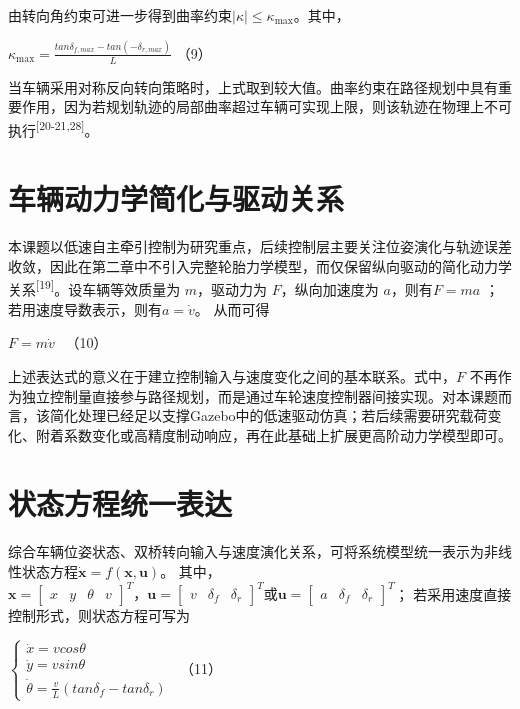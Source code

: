 由转向角约束可进一步得到曲率约束\(\mid \kappa \mid \leq \kappa_{\max}\)。其中，

\(\kappa_{\max} = \frac{tan\delta_{f,max} - tan( - \delta_{r,max})}{L}\)
（9）

当车辆采用对称反向转向策略时，上式取到较大值。曲率约束在路径规划中具有重要作用，因为若规划轨迹的局部曲率超过车辆可实现上限，则该轨迹在物理上不可执行\textsuperscript{[20-21,28]}。

\section{车辆动力学简化与驱动关系}

本课题以低速自主牵引控制为研究重点，后续控制层主要关注位姿演化与轨迹误差收敛，因此在第二章中不引入完整轮胎力学模型，而仅保留纵向驱动的简化动力学关系\textsuperscript{[19]}。设车辆等效质量为
\(m\)，驱动力为 \(F\)，纵向加速度为 \(a\)，则有\(F = ma\)
；若用速度导数表示，则有\(a = \dot{v}\)。\(
\) 从而可得

\(F = m\dot{v}\ \ \) （10）

上述表达式的意义在于建立控制输入与速度变化之间的基本联系。式中，\(F\)
不再作为独立控制量直接参与路径规划，而是通过车轮速度控制器间接实现。对本课题而言，该简化处理已经足以支撑Gazebo中的低速驱动仿真；若后续需要研究载荷变化、附着系数变化或高精度制动响应，再在此基础上扩展更高阶动力学模型即可。

\section{状态方程统一表达}

综合车辆位姿状态、双桥转向输入与速度演化关系，可将系统模型统一表示为非线性状态方程\(\dot{\mathbf{x}} = f(\mathbf{x},\mathbf{u})\)。\(
\) 其中，\(\mathbf{x} = \begin{bmatrix}
x & y & \theta & v
\end{bmatrix}^{T}，\mathbf{u} = \begin{bmatrix}
v & \delta_{f} & \delta_{r}
\end{bmatrix}^{T}\text{或}\mathbf{u} = \begin{bmatrix}
a & \delta_{f} & \delta_{r}
\end{bmatrix}^{T}\)；\(
\) 若采用速度直接控制形式，则状态方程可写为

\(\left\{ \begin{array}{r}
\dot{x} = vcos\theta \\
\dot{y} = vsin\theta \\
\dot{\theta} = \frac{v}{L}\left( tan\delta_{f} - tan\delta_{r} \right)
\end{array} \right.\ \) （11）

